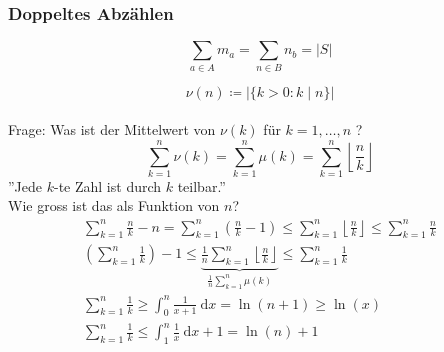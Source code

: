 \subsubsection{Doppeltes Abzählen}
\[ \sum_{a \in A} m_a = \sum_{n \in B} n_b = |S| \]
\begin{bsp*}
	\[\nu(n) \coloneqq |\{ k> 0 : k \mid n \}| \]\\
	Frage: Was ist der Mittelwert von $\nu(k)$ für $k=1, \dotsc , n$ ? \\
	\[ \sum_{k=1}^n \nu(k) = \sum_{k=1}^n \mu(k) = \sum_{k=1}^n \left\lfloor \frac{n}{k} \right\rfloor \]
	''Jede $k$-te Zahl ist durch $k$ teilbar.'' \\
	Wie gross ist das als Funktion von $n$? \\
	\begin{gather*}
		\sum_{k=1}^n \frac{n}{k} - n = \sum_{k=1}^n (\frac{n}{k} - 1) \leq \sum_{k=1}^n \left\lfloor \frac{n}{k} \right\rfloor \leq \sum_{k=1}^n \frac{n}{k} \\
		\left(\sum_{k=1}^n \frac{1}{k}\right) -1 \leq \underbrace{\frac{1}{n} \sum_{k=1}^n \left\lfloor \frac{n}{k} \right\rfloor}_{\frac{1}{n} \sum_{k=1}^n \mu(k)} \leq \sum_{k=1}^n  \frac{1}{k} \\
		\sum_{k=1}^n  \frac{1}{k} \geq \int_0^n \frac{1}{x+1} \:\mathrm{d}x = \ln(n+1) \geq \ln(x) \\
		\sum_{k=1}^n  \frac{1}{k} \leq \int_1^n \frac{1}{x} \:\mathrm{d}x+1 = \ln(n) +1
	\end{gather*}
\end{bsp*}
